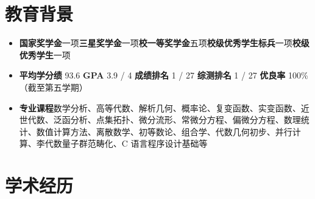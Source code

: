 \documentclass{resume}
\begin{document}




\sepspace
{}


\section{教育背景}
\begin{itemize}
  \item \textbf{国家奖学金}一项\quad\textbf{三星奖学金}一项\quad\textbf{校一等奖学金}五项\quad\textbf{校级优秀学生标兵}一项\quad\textbf{校级优秀学生}一项
  \item \textbf{平均学分绩} 93.6 \quad\textbf{GPA} 3.9 / 4 \quad\textbf{成绩排名} 1 / 27 \quad\textbf{综测排名} 1 / 27 \quad \textbf{优良率} 100\% \quad（截至第五学期）
  \item \textbf{专业课程}\quad 数学分析、高等代数、解析几何、概率论、复变函数、实变函数、近世代数、泛函分析、点集拓扑、微分流形、常微分方程、偏微分方程、数理统计、数值计算方法、离散数学、初等数论、组合学、代数几何初步、并行计算、李代数量子群范畴化、C 语言程序设计基础等
\end{itemize}

\section{学术经历}
\end{document}
